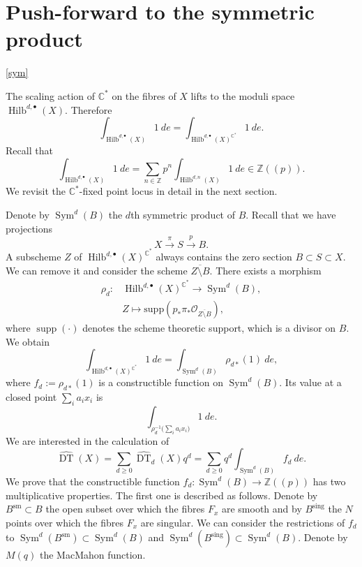 \documentclass{amsart}
\theoremstyle{definition}
\newcommand{\CC} {\mathbb{C}}          %
\newcommand{\ZZ} {\mathbb{Z}}		%
\renewcommand{\O}{\mathcal{O}}
\newcommand{\Sym}{\operatorname{Sym}}
\newcommand{\Hilb}{\operatorname{Hilb}}
\newcommand{\DT}{\operatorname{DT}}
\newcommand{\supp}{\operatorname{supp}}
\newcommand{\sm}{\operatorname{sm}}
\newcommand{\sing}{\operatorname{sing}}
\begin{document}
\section{Push-forward to the symmetric product} \ref{sym}

The scaling action of $\CC^*$ on the fibres of $X$ lifts to the moduli space $\Hilb^{d,\bullet}(X)$. Therefore
$$
\int_{\Hilb^{d,\bullet}(X)} 1 \ de = \int_{\Hilb^{d,\bullet}(X)^{\CC^*}} 1 \ de.
$$
Recall that 
$$
\int_{\Hilb^{d,\bullet}(X)} 1 \ de = \sum_{n \in \ZZ} p^n \int_{\Hilb^{d,n}(X)} 1 \ de \in \ZZ(\!(p)\!).
$$
We revisit the $\CC^*$-fixed point locus in detail in the next section. 

Denote by $\Sym^d(B)$ the $d$th symmetric product of $B$. Recall that we have projections 
$$
X \stackrel{\pi}{\longrightarrow} S \stackrel{p}{\longrightarrow} B.
$$
A subscheme $Z$ of $ \Hilb^{d,\bullet}(X)^{\CC^*}$ always contains the zero section $B \subset S \subset X$. We can remove it and consider the scheme $\overline{Z \setminus B}$. There exists a morphism
\begin{align*}
\rho_{d} : &\Hilb^{d,\bullet}(X)^{\CC^*} \longrightarrow \Sym^d(B), \\
&Z \mapsto \mathrm{supp}( p_* \pi_* \O_{\overline{Z \setminus B}} ),
\end{align*}
where $\supp(\cdot)$ denotes the scheme theoretic support, which is a divisor on $B$. 
We obtain
$$
\int_{\Hilb^{d,\bullet}(X)^{\CC^*}} 1 \ de = \int_{\Sym^d(B)} \rho_{d*}(1) \ de,
$$
where $f_d := \rho_{d*}(1)$ is a constructible function on $\Sym^d(B)$. Its value at a closed point $\sum_i a_i x_i$ is 
$$
\int_{\rho_{d}^{-1}\big(\sum_i a_i x_i\big)} 1 \ de.
$$
We are interested in the calculation of
$$
\widehat{\DT}(X) = \sum_{d \geq 0} \widehat{\DT}_d(X) q^d =\sum_{d \geq 0} q^d \int_{\Sym^d(B)} f_d \ de.
$$
We prove that the constructible function $f_d : \Sym^d(B) \rightarrow \ZZ(\!(p)\!)$ has two multiplicative properties. The first one is described as follows. Denote by $B^{\sm} \subset B$ the open subset over which the fibres $F_x$ are smooth and by $B^{\sing}$ the $N$ points over which the fibres $F_x$ are singular. We can consider the restrictions of $f_d$ to $\Sym^d(B^{\sm}) \subset \Sym^d(B)$ and $\Sym^d(B^{\sing}) \subset \Sym^d(B)$. Denote by $M(q)$ the MacMahon function.
\end{document}
